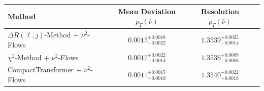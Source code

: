     \begin{tabular}{lccc}
        \toprule
        Method & Mean Deviation $p_{T}(\bar{\nu})$ & Resolution $p_{T}(\bar{\nu})$ \\
        \midrule
        $\Delta R(\ell,j)$-Method + $\nu^2$-Flows & $0.0015^{+0.0018}_{-0.0022}$ & $1.3539^{+0.0025}_{-0.0014}$ \\
        $\chi^2$-Method + $\nu^2$-Flows & $0.0017^{+0.0022}_{-0.0014}$ & $1.3536^{+0.0009}_{-0.0008}$ \\
        CompactTransformer + $\nu^2$-Flows & $0.0011^{+0.0015}_{-0.0010}$ & $1.3540^{+0.0022}_{-0.0018}$ \\
        \bottomrule
    \end{tabular}